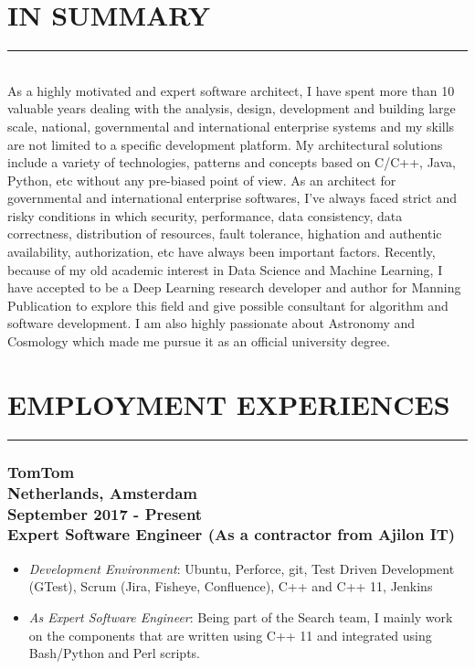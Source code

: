 \documentclass[10pt,a4paper]{article}
\begin{document}
\thispagestyle{fancy}

\hfill \break
\section{IN SUMMARY}
\noindent \rule {3.5cm}{0.4pt} \\
As a highly motivated and expert software architect, I have spent more than 10 valuable years dealing with the analysis, design, development and building large scale, national, governmental and international enterprise systems and my skills are not limited to a specific development platform. My architectural solutions include a variety of technologies, patterns and concepts based on C/C++, Java, Python, etc without any pre-biased point of view. As an architect for governmental and international enterprise softwares, I've always faced strict and risky conditions in which security, performance, data consistency, data correctness, distribution of resources, fault tolerance, highation and authentic availability, authorization, etc have always been important factors. Recently, because of my old academic interest in Data Science and Machine Learning, I have accepted to be a Deep Learning research developer and author for Manning Publication to explore this field and give possible consultant for algorithm and software development. I am also highly passionate about Astronomy and Cosmology which made me pursue it as an official university degree.

\section{EMPLOYMENT EXPERIENCES}
\noindent \rule {7.3cm}{0.4pt}

\subsubsection{{\large TomTom} \\ \textnormal{Netherlands, Amsterdam} \\ \textnormal{September 2017 - Present} \\ {Expert Software Engineer (As a contractor from Ajilon IT)}}
  \setlength{\leftskip}{0.5cm}
  \setlength{\rightskip}{1cm}
  \begin{itemize}
    \setlength{\rightskip}{1cm}
    \setlength\itemsep{0em}
    \item \small \textit {Development Environment}: Ubuntu, Perforce, git, Test Driven Development (GTest), Scrum (Jira, Fisheye, Confluence), C++ and C++ 11, Jenkins
    \item \small \textit {As Expert Software Engineer}: Being part of the Search team, I mainly work on the components that are written using C++ 11 and integrated using Bash/Python and Perl scripts.
  \end{itemize}
  \setlength{\leftskip}{0pt}
  \setlength{\rightskip}{0cm}
  
\end{document}
